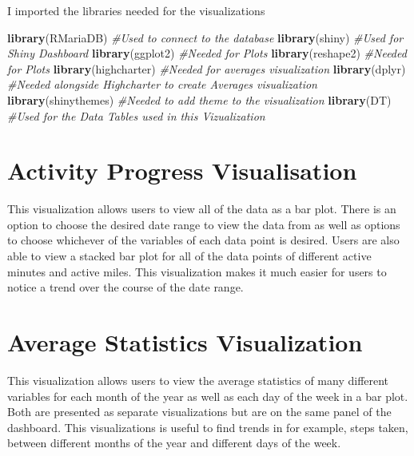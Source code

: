 \documentclass[]{book}
\newenvironment{Shaded}{\begin{snugshade}}{\end{snugshade}}
\newcommand{\CommentTok}[1]{\textcolor[rgb]{0.56,0.35,0.01}{\textit{#1}}}
\newcommand{\KeywordTok}[1]{\textcolor[rgb]{0.13,0.29,0.53}{\textbf{#1}}}
\newcommand{\NormalTok}[1]{#1}
\begin{document}
I imported the libraries needed for the visualizations

\begin{Shaded}
\begin{Highlighting}[]
\KeywordTok{library}\NormalTok{(RMariaDB) }\CommentTok{#Used to connect to the database}
\KeywordTok{library}\NormalTok{(shiny) }\CommentTok{#Used for Shiny Dashboard}
\KeywordTok{library}\NormalTok{(ggplot2) }\CommentTok{#Needed for Plots}
\KeywordTok{library}\NormalTok{(reshape2) }\CommentTok{#Needed for Plots}
\KeywordTok{library}\NormalTok{(highcharter) }\CommentTok{#Needed for averages visualization}
\KeywordTok{library}\NormalTok{(dplyr) }\CommentTok{#Needed alongside Highcharter to create Averages visualization}
\KeywordTok{library}\NormalTok{(shinythemes) }\CommentTok{#Needed to add theme to the visualization}
\KeywordTok{library}\NormalTok{(DT) }\CommentTok{#Used for the Data Tables used in this Vizualization}
\end{Highlighting}
\end{Shaded}

\hypertarget{activity-progress-visualisation}{%
\section{Activity Progress Visualisation}\label{activity-progress-visualisation}}

This visualization allows users to view all of the data as a bar plot. There is an option to choose the desired date range to view the data from as well as options to choose whichever of the variables of each data point is desired. Users are also able to view a stacked bar plot for all of the data points of different active minutes and active miles. This visualization makes it much easier for users to notice a trend over the course of the date range.

\hypertarget{average-statistics-visualization}{%
\section{Average Statistics Visualization}\label{average-statistics-visualization}}

This visualization allows users to view the average statistics of many different variables for each month of the year as well as each day of the week in a bar plot. Both are presented as separate visualizations but are on the same panel of the dashboard. This visualizations is useful to find trends in for example, steps taken, between different months of the year and different days of the week.
\end{document}
